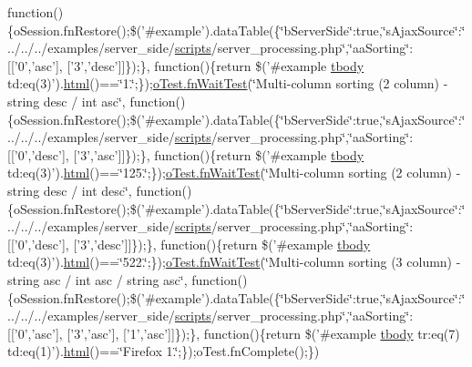 \begin{DoxyCompactItemize}
function()\{o\+Session.\+fn\+Restore();\$('\#example').data\+Table(\{\char`\"{}b\+Server\+Side\char`\"{}\+:true,\char`\"{}s\+Ajax\+Source\char`\"{}\+:\char`\"{}../../../examples/server\+\_\+side/\hyperlink{tinymce_8jquery_8dev_8js_a09066d4d580eeec222f858d588b4cdef}{scripts}/server\+\_\+processing.\+php\char`\"{},\char`\"{}aa\+Sorting\char`\"{}\+:\mbox{[}\mbox{[}'0','asc'\mbox{]}, \mbox{[}'3','desc'\mbox{]}\mbox{]}\});\}, function()\{return \$('\#example \hyperlink{core_8constructor_8js_a99b0542c7c50fe8757c55bf9dac5f3be}{tbody} td\+:eq(3)').\hyperlink{tinymce_8jquery_8dev_8js_ac2090bcf2ff968c0083d5de53a6544f3}{html}()==\char`\"{}1.\char`\"{};\});\hyperlink{onhold_24__server-side_2__zero__config_8js_ab25c4d596771c0133cdc45178ce72c3d}{o\+Test.\+fn\+Wait\+Test}(\char`\"{}Multi-\/column sorting (2 column) -\/ string desc / int asc\char`\"{}, function()\{o\+Session.\+fn\+Restore();\$('\#example').data\+Table(\{\char`\"{}b\+Server\+Side\char`\"{}\+:true,\char`\"{}s\+Ajax\+Source\char`\"{}\+:\char`\"{}../../../examples/server\+\_\+side/\hyperlink{tinymce_8jquery_8dev_8js_a09066d4d580eeec222f858d588b4cdef}{scripts}/server\+\_\+processing.\+php\char`\"{},\char`\"{}aa\+Sorting\char`\"{}\+:\mbox{[}\mbox{[}'0','desc'\mbox{]}, \mbox{[}'3','asc'\mbox{]}\mbox{]}\});\}, function()\{return \$('\#example \hyperlink{core_8constructor_8js_a99b0542c7c50fe8757c55bf9dac5f3be}{tbody} td\+:eq(3)').\hyperlink{tinymce_8jquery_8dev_8js_ac2090bcf2ff968c0083d5de53a6544f3}{html}()==\char`\"{}125.\char`\"{};\});\hyperlink{onhold_24__server-side_2__zero__config_8js_ab25c4d596771c0133cdc45178ce72c3d}{o\+Test.\+fn\+Wait\+Test}(\char`\"{}Multi-\/column sorting (2 column) -\/ string desc / int desc\char`\"{}, function()\{o\+Session.\+fn\+Restore();\$('\#example').data\+Table(\{\char`\"{}b\+Server\+Side\char`\"{}\+:true,\char`\"{}s\+Ajax\+Source\char`\"{}\+:\char`\"{}../../../examples/server\+\_\+side/\hyperlink{tinymce_8jquery_8dev_8js_a09066d4d580eeec222f858d588b4cdef}{scripts}/server\+\_\+processing.\+php\char`\"{},\char`\"{}aa\+Sorting\char`\"{}\+:\mbox{[}\mbox{[}'0','desc'\mbox{]}, \mbox{[}'3','desc'\mbox{]}\mbox{]}\});\}, function()\{return \$('\#example \hyperlink{core_8constructor_8js_a99b0542c7c50fe8757c55bf9dac5f3be}{tbody} td\+:eq(3)').\hyperlink{tinymce_8jquery_8dev_8js_ac2090bcf2ff968c0083d5de53a6544f3}{html}()==\char`\"{}522.\char`\"{};\});\hyperlink{onhold_24__server-side_2__zero__config_8js_ab25c4d596771c0133cdc45178ce72c3d}{o\+Test.\+fn\+Wait\+Test}(\char`\"{}Multi-\/column sorting (3 column) -\/ string asc / int asc / string asc\char`\"{}, function()\{o\+Session.\+fn\+Restore();\$('\#example').data\+Table(\{\char`\"{}b\+Server\+Side\char`\"{}\+:true,\char`\"{}s\+Ajax\+Source\char`\"{}\+:\char`\"{}../../../examples/server\+\_\+side/\hyperlink{tinymce_8jquery_8dev_8js_a09066d4d580eeec222f858d588b4cdef}{scripts}/server\+\_\+processing.\+php\char`\"{},\char`\"{}aa\+Sorting\char`\"{}\+:\mbox{[}\mbox{[}'0','asc'\mbox{]}, \mbox{[}'3','asc'\mbox{]}, \mbox{[}'1','asc'\mbox{]}\mbox{]}\});\}, function()\{return \$('\#example \hyperlink{core_8constructor_8js_a99b0542c7c50fe8757c55bf9dac5f3be}{tbody} tr\+:eq(7) td\+:eq(1)').\hyperlink{tinymce_8jquery_8dev_8js_ac2090bcf2ff968c0083d5de53a6544f3}{html}()==\char`\"{}Firefox 1.\char`\"{};\});o\+Test.\+fn\+Complete();\})

\end{DoxyCompactItemize}
